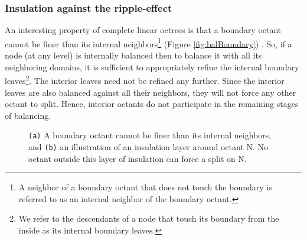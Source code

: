 \subsubsection{Insulation against the ripple-effect}
\label{sec:insulation}
An interesting property of complete linear octrees is that a boundary
octant cannot be finer than its internal neighbors\footnote{A neighbor
of a boundary octant that does not touch the boundary is referred to
as an internal neighbor of the boundary octant.} (Figure
\ref{fig:balBoundary}) \cite{tu04a}. So, if a node (at any level) is
internally balanced then to balance it with all its neighboring
domains, it is sufficient to appropriately refine the internal
boundary leaves\footnote{We refer to the descendants of a node that
touch its boundary from the inside as its internal boundary
leaves.}. The interior leaves need not be refined any further. Since
the interior leaves are also balanced against all their neighbors,
they will not force any other octant to split. Hence, interior octants
do not participate in the remaining stages of balancing.

\begin{figure}
  \begin{center}
    \hspace{0.1in}
  \end{center}
  \caption{{\tt(a)} A boundary octant cannot be finer than its
  internal neighbors, and {\tt(b)} an illustration of an insulation
  layer around octant N. No octant outside this layer of insulation
  can force a split on N.}
\end{figure}

